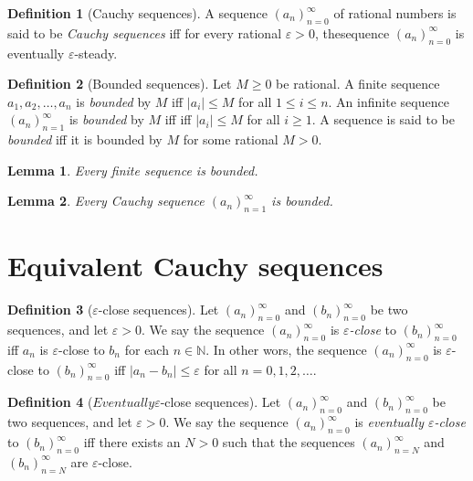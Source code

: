 \documentclass[
]{book}
\newtheorem{lemma}{Lemma}[chapter]
\theoremstyle{definition}
\newtheorem{definition}{Definition}[chapter]
\theoremstyle{definition}
\theoremstyle{definition}
\theoremstyle{definition}
\theoremstyle{remark}
\begin{document}
\begin{definition}[Cauchy sequences]
A sequence \((a_n)_{n=0}^{\infty}\) of rational numbers is said to be \emph{Cauchy sequences} iff for every rational \(\varepsilon>0\), thesequence \((a_n)_{n=0}^{\infty}\) is eventually \(\varepsilon\)-steady.
\end{definition}

\begin{definition}[Bounded sequences]
Let \(M\geq 0\) be rational. A finite sequence \(a_1,a_2, \dots, a_n\) is \emph{bounded} by \(M\) iff \(|a_i|\leq M\) for all \(1\leq i \leq n\). An infinite sequence \((a_n)_{n=1}^{\infty}\) is \emph{bounded} by \(M\) iff iff \(|a_i|\leq M\) for all \(i\geq 1\). A sequence is said to be \emph{bounded} iff it is bounded by \(M\) for some rational \(M>0\).
\end{definition}

\begin{lemma}
Every finite sequence is bounded.
\end{lemma}

\begin{lemma}
Every Cauchy sequence \((a_n)_{n=1}^{\infty}\) is bounded.
\end{lemma}

\section{Equivalent Cauchy sequences}\label{equivalent-cauchy-sequences}

\begin{definition}[$\varepsilon$-close sequences]
Let \((a_n)_{n=0}^{\infty}\) and \((b_n)_{n=0}^{\infty}\) be two sequences, and let \(\varepsilon>0\). We say the sequence \((a_n)_{n=0}^{\infty}\) is \emph{\(\varepsilon\)-close} to \((b_n)_{n=0}^{\infty}\) iff \(a_n\) is \(\varepsilon\)-close to \(b_n\) for each \(n\in \mathbb{N}\). In other wors, the sequence \((a_n)_{n=0}^{\infty}\) is \(\varepsilon\)-close to \((b_n)_{n=0}^{\infty}\) iff \(|a_n-b_n|\leq \varepsilon\) for all \(n=0,1,2,\dots\).
\end{definition}

\begin{definition}[$Eventually \varepsilon$-close sequences]
Let \((a_n)_{n=0}^{\infty}\) and \((b_n)_{n=0}^{\infty}\) be two sequences, and let \(\varepsilon>0\). We say the sequence \((a_n)_{n=0}^{\infty}\) is \emph{eventually \(\varepsilon\)-close} to \((b_n)_{n=0}^{\infty}\) iff there exists an \(N>0\) such that the sequences \((a_n)_{n=N}^{\infty}\) and \((b_n)_{n=N}^{\infty}\) are \(\varepsilon\)-close.
\end{definition}
\end{document}
